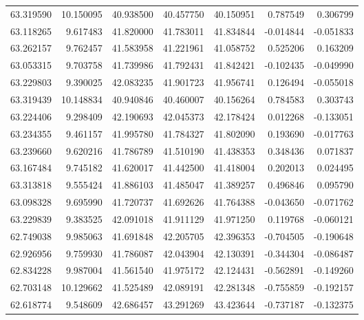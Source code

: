 \begin{tabular}{rrrrrrr}
 63.319590 &  10.150095 &         40.938500 &         40.457750 &         40.150951 &  0.787549 &  0.306799 \\
 63.118265 &   9.617483 &         41.820000 &         41.783011 &         41.834844 & -0.014844 & -0.051833 \\
 63.262157 &   9.762457 &         41.583958 &         41.221961 &         41.058752 &  0.525206 &  0.163209 \\
 63.053315 &   9.703758 &         41.739986 &         41.792431 &         41.842421 & -0.102435 & -0.049990 \\
 63.229803 &   9.390025 &         42.083235 &         41.901723 &         41.956741 &  0.126494 & -0.055018 \\
 63.319439 &  10.148834 &         40.940846 &         40.460007 &         40.156264 &  0.784583 &  0.303743 \\
 63.224406 &   9.298409 &         42.190693 &         42.045373 &         42.178424 &  0.012268 & -0.133051 \\
 63.234355 &   9.461157 &         41.995780 &         41.784327 &         41.802090 &  0.193690 & -0.017763 \\
 63.239660 &   9.620216 &         41.786789 &         41.510190 &         41.438353 &  0.348436 &  0.071837 \\
 63.167484 &   9.745182 &         41.620017 &         41.442500 &         41.418004 &  0.202013 &  0.024495 \\
 63.313818 &   9.555424 &         41.886103 &         41.485047 &         41.389257 &  0.496846 &  0.095790 \\
 63.098328 &   9.695990 &         41.720737 &         41.692626 &         41.764388 & -0.043650 & -0.071762 \\
 63.229839 &   9.383525 &         42.091018 &         41.911129 &         41.971250 &  0.119768 & -0.060121 \\
 62.749038 &   9.985063 &         41.691848 &         42.205705 &         42.396353 & -0.704505 & -0.190648 \\
 62.926956 &   9.759930 &         41.786087 &         42.043904 &         42.130391 & -0.344304 & -0.086487 \\
 62.834228 &   9.987004 &         41.561540 &         41.975172 &         42.124431 & -0.562891 & -0.149260 \\
 62.703148 &  10.129662 &         41.525489 &         42.089191 &         42.281348 & -0.755859 & -0.192157 \\
 62.618774 &   9.548609 &         42.686457 &         43.291269 &         43.423644 & -0.737187 & -0.132375 \\

\end{tabular}
